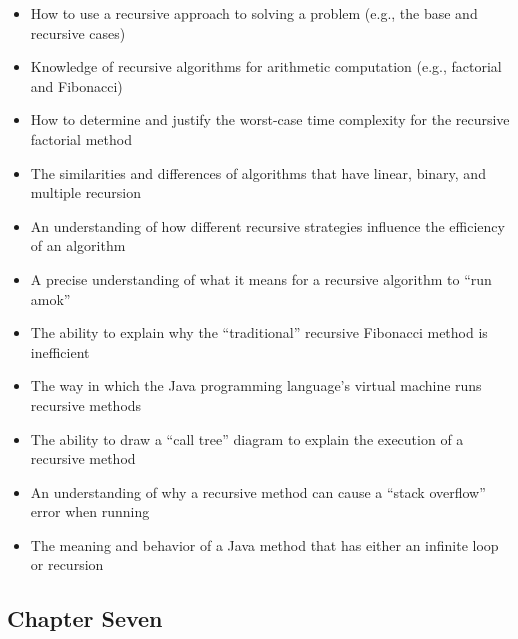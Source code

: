 \documentclass[11pt]{article}
\begin{document}
\begin{itemize}

  \setlength{\itemsep}{0.05in}

  \item How to use a recursive approach to solving a problem (e.g., the base
    and recursive cases)
  \item Knowledge of recursive algorithms for arithmetic computation (e.g., factorial
    and Fibonacci)
  \item How to determine and justify the worst-case time complexity for
    the recursive factorial method
  \item The similarities and differences of algorithms that have linear, binary, and multiple
    recursion
  \item An understanding of how different recursive strategies influence the
    efficiency of an algorithm
  \item A precise understanding of what it means for a recursive algorithm to
    ``run amok''
  \item The ability to explain why the ``traditional'' recursive Fibonacci
    method is inefficient
  \item The way in which the Java programming language's virtual machine runs recursive methods
  \item The ability to draw a ``call tree'' diagram to explain the
    execution of a recursive method
  \item An understanding of why a recursive method can cause a ``stack
    overflow'' error when running
  \item The meaning and behavior of a Java method that has either an infinite
    loop or recursion

\end{itemize}

\vspace*{-.2in}
\subsection*{Chapter Seven}
\end{document}
